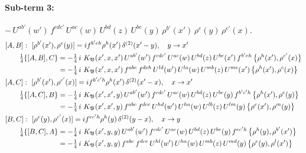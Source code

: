 \documentclass[10pt]{article}
\numberwithin{equation}{section}
\begin{document}
\paragraph{Sub-term 3:} $-\,U^{ab'}(w')\,f^{cdc'}\,U^{ac}(w)\,U^{bd}(z)\,U^{be}(y)\,\rho^{b'}(x')\,\rho^{e}(y)\,\rho^{c'}(x)$.
\begin{align}
&[A,B]:\ [\rho^{b'}(x'),\rho^{e}(y)]=i f^{b'eh}\rho^{h}(x')\,\delta^{(2)}(x'-y),\quad y\to x'\notag\\
&\qquad \tfrac14\{[A,B],C\}=-\tfrac14\,i\,\,K_{\mathfrak B}(x',x,x')\,U^{ab'}(w')\,f^{cdc'}\,U^{ac}(w)\,U^{bd}(z)\,U^{be}(x')\,f^{b'eh}\,\big\{\rho^{h}(x'),\rho^{c'}(x)\big\}\notag\\
&\qquad\phantom{\tfrac14\{[A,B],C\}}=-\tfrac14\,i\,\,K_{\mathfrak B}(x',x,x')\,f^{abc}\,f^{deh}\,U^{ld}(w')\,U^{la}(w)\,U^{mb}(z)\,U^{me}(x')\,\big\{\rho^{h}(x'),\rho^{c}(x)\big\}
\label{R:eq:GI.IV-3-AB}\\
&[A,C]:\ [\rho^{b'}(x'),\rho^{c'}(x)]=i f^{b'c'h}\rho^{h}(x')\,\delta^{(2)}(x'-x),\quad x\to x'\notag\\
&\qquad \tfrac14\{[A,C],B\}=-\tfrac14\,i\,\,K_{\mathfrak B}(x',x',y)\,U^{ab'}(w')\,f^{cdc'}\,U^{ac}(w)\,U^{bd}(z)\,U^{be}(y)\,f^{b'c'h}\,\big\{\rho^{h}(x'),\rho^{e}(y)\big\}\notag\\
&\qquad\phantom{\tfrac14\{[A,C],B\}}=-\tfrac14\,i\,\,K_{\mathfrak B}(x',x',y)\,f^{abc}\,f^{dce}\,U^{hd}(w')\,U^{ha}(w)\,U^{lb}(z)\,U^{lm}(y)\,\big\{\rho^{e}(x'),\rho^{m}(y)\big\}
\label{R:eq:GI.IV-3-AC}\\
&[B,C]:\ [\rho^{e}(y),\rho^{c'}(x)]=i f^{ec'h}\rho^{h}(y)\,\delta^{(2)}(y-x),\quad x\to y\notag\\
&\qquad \tfrac14\{[B,C],A\}=-\tfrac14\,i\,\,K_{\mathfrak B}(x',y,y)\,U^{ab'}(w')\,f^{cdc'}\,U^{ac}(w)\,U^{bd}(z)\,U^{be}(y)\,f^{ec'h}\,\big\{\rho^{h}(y),\rho^{b'}(x')\big\}\notag\\
&\qquad\phantom{\tfrac14\{[B,C],A\}}=-\tfrac14\,i\,\,K_{\mathfrak B}(x',y,y)\,f^{abc}\,f^{dce}\,U^{hl}(w')\,U^{ha}(w)\,U^{mb}(z)\,U^{md}(y)\,\big\{\rho^{e}(y),\rho^{l}(x')\big\}
\label{R:eq:GI.IV-3-BC}
\end{align}
\end{document}
